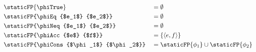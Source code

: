 \begin{align*}
	 & \staticFP {\phiTrue}                       &  & = \emptyset                                  \\
	 & \staticFP {\phiEq {$e_1$} {$e_2$}}         &  & = \emptyset                                  \\
	 & \staticFP {\phiNeq {$e_1$} {$e_2$}}        &  & = \emptyset                                  \\
	 & \staticFP {\phiAcc {$e$} {$f$}}            &  & = \{\langle e,f \rangle\}                                  \\
	 & \staticFP {\phiCons {$\phi_1$} {$\phi_2$}} &  & = \staticFP {\phi_1} \cup \staticFP {\phi_2}
\end{align*}


